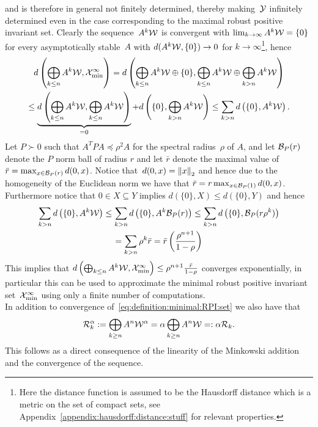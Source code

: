 %
and is therefore in general not finitely determined, thereby making~$\mathcal Y$ infinitely determined even in the case corresponding to the maximal robust positive invariant set.
%
Clearly the sequence~$A^k\mathcal W$ is convergent with $\lim_{k\rightarrow\infty}A^k\mathcal W=\{0\}$ for every asymptotically stable~$A$ with $d(A^k\mathcal W,\{0\})\rightarrow0$ for $k\rightarrow\infty$\footnote{Here the distance function is assumed to be the Hausdorff distance which is a metric on the set of compact sets, see Appendix~\ref{appendix:hausdorff:distance:stuff} for relevant properties.}, hence
%
\begin{multline}
	d\left(\bigoplus_{k\leq n}A^k\mathcal W,\mathcal X^\infty_{\min}\right) = d\left(\bigoplus_{k\leq n}A^k\mathcal W \oplus\{0\},\bigoplus_{k\leq n}A^k\mathcal W\oplus \bigoplus_{k>n}A^k\mathcal W \right)\\
	 \leq \underbrace{d\left(\bigoplus_{k\leq n}A^k\mathcal W,\bigoplus_{k\leq n}A^k\mathcal W \right)}_{=0} + d\left(\{0\},\bigoplus_{k> n}A^k\mathcal W\right)\leq \sum_{k>n}d\left(\{0\},A^k\mathcal W\right).
\end{multline}
%
Let $P\succ0$ such that $A^TPA\preceq\rho^2 A$ for the spectral radius~$\rho$ of $A$, and let $\mathcal B_P(r)$ denote the $P$ norm ball of radius $r$ and let $\bar r$ denote the maximal value of $\bar r = \max_{x\in\mathcal B_P(r)} d(0,x)$.
%
Notice that~$d(0,x) = \left\|x\right\|_2$ and hence due to the homogeneity of the Euclidean norm we have that $\bar r = r \max_{x\in\mathcal B_P(1)}d(0,x)$.
%
Furthermore notice that $0\in X\subseteq Y$ implies $d(\{0\},X)\leq d(\{0\},Y)$ and hence
%
\begin{multline}
	\sum_{k>n}d\left(\{0\},A^k\mathcal W\right)\leq \sum_{k>n}d\left(\{0\},A^k\mathcal B_P(r)\right)\leq \sum_{k>n}d\left(\{0\},\mathcal B_P(r\rho^{k})\right) \\
	= \sum_{k>n}\rho^{k}\bar r= \bar r\left(\frac{\rho^{n+1}}{1-\rho}\right)
\end{multline}
%
This implies that $d\left(\bigoplus_{k\leq n}A^k\mathcal W,\mathcal X^\infty_{\min}\right)\leq\rho^{n+1}\frac{\bar r}{1-\rho}$ converges exponentially, in particular this can be used to approximate the minimal robust positive invariant set~$\mathcal X^\infty_{\min}$ using only a finite number of computations.
%
\\[1em]
%
In addition to convergence of~\eqref{eq:definition:minimal:RPI:set} we also have that
%
\begin{equation}
	\mathcal R^{\alpha}_k := \bigoplus_{k\geq n}A^n\mathcal W^\alpha = \alpha \bigoplus_{k\geq n}A^n\mathcal W =:\alpha \mathcal R_k.
\end{equation}
%
This follows as a direct consequence of the linearity of the Minkowski addition and the convergence of the sequence.
